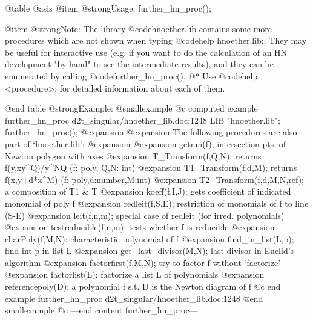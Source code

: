 @table @asis
@item @strong{Usage:}
further_hn_proc();

@item @strong{Note:}
The library @code{hnoether.lib} contains some more procedures which
are not shown when typing @code{help hnoether.lib;}. They may be useful
for interactive use (e.g. if you want to do the calculation of an HN
development "by hand" to see the intermediate results), and they
can be enumerated by calling @code{further_hn_proc()}. @*
Use @code{help <procedure>;} for detailed information about each of
them.

@end table
@strong{Example:}
@smallexample
@c computed example further_hn_proc d2t_singular/hnoether_lib.doc:1248 
LIB "hnoether.lib";
further_hn_proc();
@expansion{} 
@expansion{}  The following procedures are also part of `hnoether.lib':
@expansion{} 
@expansion{}  getnm(f);           intersection pts. of Newton polygon with axes
@expansion{}  T_Transform(f,Q,N); returns f(y,xy^Q)/y^NQ (f: poly, Q,N: int)
@expansion{}  T1_Transform(f,d,M); returns f(x,y+d*x^M)  (f: poly,d:number,M:int)
@expansion{}  T2_Transform(f,d,M,N,ref);   a composition of T1 & T
@expansion{}  koeff(f,I,J);       gets coefficient of indicated monomial of poly f
@expansion{}  redleit(f,S,E);     restriction of monomials of f to line (S-E)
@expansion{}  leit(f,n,m);        special case of redleit (for irred. polynomials)
@expansion{}  testreducible(f,n,m); tests whether f is reducible
@expansion{}  charPoly(f,M,N);    characteristic polynomial of f
@expansion{}  find_in_list(L,p);  find int p in list L
@expansion{}  get_last_divisor(M,N); last divisor in Euclid's algorithm
@expansion{}  factorfirst(f,M,N); try to factor f without `factorize'
@expansion{}  factorlist(L);      factorize a list L of polynomials
@expansion{}  referencepoly(D);   a polynomial f s.t. D is the Newton diagram of f
@c end example further_hn_proc d2t_singular/hnoether_lib.doc:1248
@end smallexample
@c ---end content further_hn_proc---
